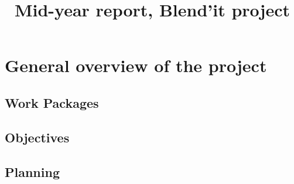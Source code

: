 \documentclass[a4paper,10pt]{article}
\title{Mid-year report, Blend'it project}
\author{}
\begin{document}
\maketitle

\tableofcontents

\section{General overview of the project}
\subsection{Work Packages}

\subsection{Objectives}
\subsection{Planning}





\begingroup




\endgroup
\end{document}
